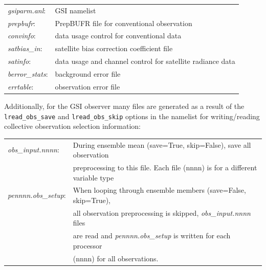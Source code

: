 \begin{table}[htbp]
\centering
\begin{tabular}{ll}

\textit{gsiparm.anl}: & GSI namelist \\

\textit{prepbufr}: & PrepBUFR file for conventional observation \\

\textit{convinfo}: & data usage control for conventional data   \\

\textit{satbias\_in}: & satellite bias correction coefficient file   \\

\textit{satinfo}: & data usage and channel control for satellite radiance data \\ 
  
\textit{berror\_stats}: & background error file  \\
 
\textit{errtable}: & observation error file \\
            
\end{tabular}
\end{table}

Additionally, for the GSI observer many files are generated as a result of the \verb|lread_obs_save| and \verb|lread_obs_skip| options in the namelist for writing/reading collective observation selection information:

\begin{table}[htbp]
\centering
\begin{tabular}{ll}

\textit{obs\_input.nnnn}: & During ensemble mean (save=True, skip=False), save all observation \\
                                       & preprocessing to this file. Each file (nnnn) is for a different variable type\\
                                      

\textit{pennnn.obs\_setup}: &  When looping through ensemble members (save=False, skip=True), \\
                                            & all observation preprocessing is skipped, \textit{obs\_input.nnnn} files \\
                                            & are read and \textit{pennnn.obs\_setup} is written for each processor \\
                                            & (nnnn) for all observations.

\end{tabular}
\end{table}

